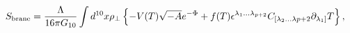 \begin{equation}\label{brane_action}
S_{{\rm{brane}}} = {\frac{\Lambda}{16\pi G_{10}}} \int d^{10}x
\rho_{\perp} \left\{ - V(T)\sqrt{-A}e^{-\Phi} + f(T)
\epsilon^{\lambda_{1}\ldots\lambda_{p+2}}
C_{[\lambda_{2}\ldots\lambda{p+2}} \partial_{\lambda_{1}]}T
\right\},
\end{equation}

